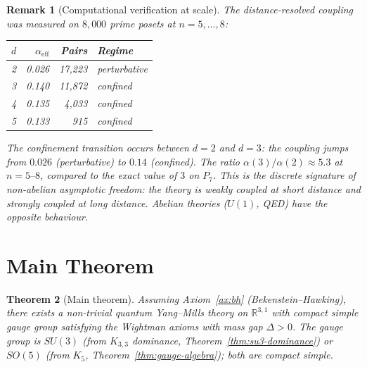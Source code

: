 \documentclass[11pt]{article}
\newtheorem{theorem}{Theorem}[section]
\newtheorem{remark}[theorem]{Remark}
\newcommand{\Kthree}{K_{3,3}}
\begin{document}
\begin{remark}[Computational verification at scale]
The distance-resolved coupling was measured on $8{,}000$
prime posets at $n = 5, \ldots, 8$:
\begin{center}
\renewcommand{\arraystretch}{1.3}
\begin{tabular}{crrl}
\toprule
$d$ & $\alpha_{\mathrm{eff}}$ & Pairs & Regime \\
\midrule
2 & 0.026 & 17{,}223 & perturbative \\
3 & 0.140 & 11{,}872 & confined \\
4 & 0.135 & 4{,}033 & confined \\
5 & 0.133 & 915 & confined \\
\bottomrule
\end{tabular}
\end{center}
The confinement transition occurs between $d = 2$ and
$d = 3$: the coupling jumps from $0.026$ (perturbative)
to $0.14$ (confined).  The ratio $\alpha(3)/\alpha(2)
\approx 5.3$ at $n = 5\text{--}8$, compared to the exact
value of $3$ on $P_7$.  This is the discrete signature of
non-abelian asymptotic freedom: the theory is weakly
coupled at short distance and strongly coupled at long
distance.  Abelian theories ($U(1)$, QED) have the
opposite behaviour.
\end{remark}

\section{Main Theorem}
\label{sec:main}

\begin{theorem}[Main theorem]
\label{thm:main}
Assuming Axiom~\ref{ax:bh} (Bekenstein--Hawking), there
exists a non-trivial quantum Yang--Mills theory on
$\mathbb{R}^{3,1}$ with compact simple gauge group
satisfying the Wightman axioms with mass gap $\Delta > 0$.
The gauge group is $SU(3)$ (from $\Kthree$ dominance,
Theorem~\ref{thm:su3-dominance}) or $SO(5)$ (from $K_5$,
Theorem~\ref{thm:gauge-algebra}); both are compact simple.
\end{theorem}
\end{document}
